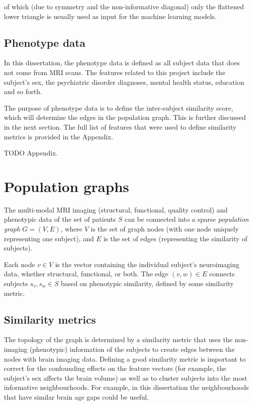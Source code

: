 of which (due to symmetry and the non-informative diagonal) only the flattened lower triangle is usually used as input for the machine learning models.

\subsection{Phenotype data}

In this dissertation, the phenotype data is defined as all subject data that does not come from MRI scans. The features related to this project include the subject's sex, the psychiatric disorder diagnoses, mental health status, education and so forth.

The purpose of phenotype data is to define the inter-subject similarity score, which will determine the edges in the population graph. This is further discussed in the next section. The full list of features that were used to define similarity metrics is provided in the Appendix.

TODO Appendix.

\section{Population graphs}
\label{population-graphs}

The multi-modal MRI imaging (structural, functional, quality control) and phenotypic data of the set of patients $S$ can be connected into a sparse \textit{population graph} $G = (V, E)$, where $V$ is the set of graph nodes (with one node uniquely representing one subject), and $E$ is the set of edges (representing the similarity of subjects).

Each node $v \in V$ is the vector containing the individual subject's neuroimaging data, whether structural, functional, or both. The edge $(v, w) \in E$ connects subjects $s_v, s_w \in S$ based on phenotypic similarity, defined by some similarity metric.

\subsection{Similarity metrics}
The topology of the graph is determined by a similarity metric that uses the non-imaging (phenotypic) information of the subjects to create edges between the nodes with brain imaging data. Defining a good similarity metric is important to correct for the confounding effects on the feature vectors (for example, the subject's sex affects the brain volume) as well as to cluster subjects into the most informative neighbourhoods. For example, in this dissertation the neighbourhoods that have similar brain age gaps could be useful.

